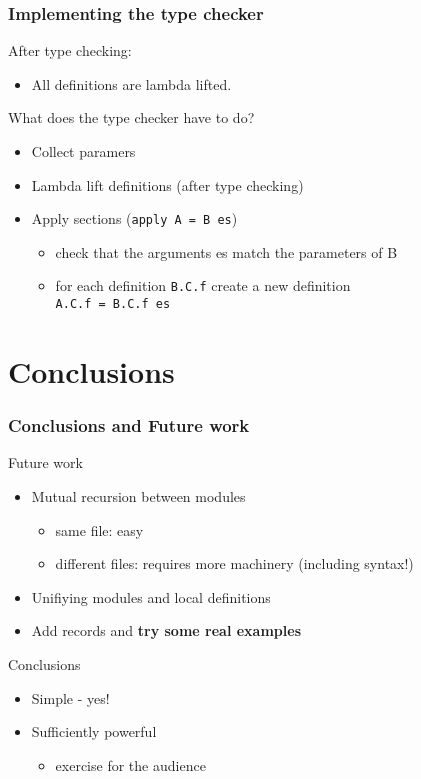 \documentclass{beamer}
\begin{document}
\begin{frame}[fragile]
  \frametitle{Implementing the type checker}

  After type checking:
  \begin{itemize}
    \item All definitions are lambda lifted.
  \end{itemize}

  What does the type checker have to do?
  \begin{itemize}
    \item Collect paramers
    \item Lambda lift definitions (after type checking)
    \item Apply sections ({\tt apply A = B es})
    \begin{itemize}
      \item check that the arguments es match the parameters of B
      \item for each definition {\tt B.C.f} create a new definition \\
            {\tt A.C.f = B.C.f es}
    \end{itemize}
  \end{itemize}

\end{frame}


\section{Conclusions}

\begin{frame}[fragile]
  \frametitle{Conclusions and Future work}

  Future work
  \begin{itemize}
    \item Mutual recursion between modules
    \begin{itemize}
      \item same file: easy
      \item different files: requires more machinery (including syntax!)
    \end{itemize}
    \item Unifiying modules and local definitions
    \item Add records and {\bf try some real examples}
  \end{itemize}

  Conclusions
  \begin{itemize}
    \item Simple - yes!
    \item Sufficiently powerful
    \begin{itemize}
      \item<2> exercise for the audience
    \end{itemize}
  \end{itemize}
\end{frame}
\end{document}

